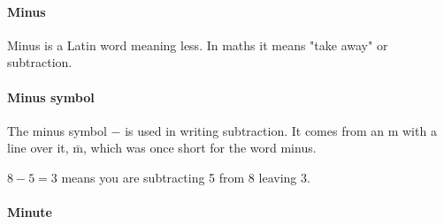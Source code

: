 \documentclass[12pt]{article}
\begin{document}
\paragraph{Minus}
Minus is a Latin word meaning less. In maths it means "take away" or subtraction.

\paragraph{Minus symbol}
The minus symbol $-$ is used in writing subtraction. It comes from an m with a line over it, $\bar{\textrm{m}}$, which was once short for the word minus.

$8-5=3$ means you are subtracting 5 from 8 leaving 3.

\paragraph{Minute}
\end{document}
